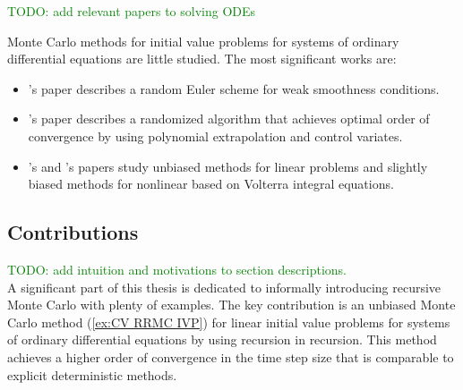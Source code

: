 \documentclass[a4paper,12pt]{article}
\begin{document}
\begin{related}

    \textcolor{green}{
        TODO: add relevant papers to solving ODEs
    }

    Monte Carlo methods for initial value problems for systems of ordinary
    differential equations are little studied. The most significant works are:
    \begin{itemize}
        \item \citeauthor{jentzen_random_2009}'s \citeyear{jentzen_random_2009}
              \cite{jentzen_random_2009} paper describes a random Euler scheme for
              weak smoothness conditions.

        \item \citeauthor{daun_randomized_2011}'s \citeyear{daun_randomized_2011}
              \cite{daun_randomized_2011} paper describes a randomized algorithm that
              achieves optimal order of convergence by using polynomial
              extrapolation and control variates.

        \item \citeauthor{ermakov_monte_2019}'s \citeyear{ermakov_monte_2019}
              \cite{ermakov_monte_2019}
              and \citeauthor{ermakov_monte_2021}'s \citeyear{ermakov_monte_2021}
              \cite{ermakov_monte_2021}
              papers study unbiased  methods
              for linear problems and slightly biased methods for nonlinear based
              on Volterra integral equations.

    \end{itemize}


\end{related}

\subsection{Contributions}

\textcolor{green}{
    TODO: add intuition and motivations to section descriptions.\\
}
A significant part of this thesis is dedicated to informally introducing recursive Monte Carlo
with plenty of examples.
The key contribution is an unbiased Monte Carlo method
(\ref{ex:CV RRMC IVP}) for
linear initial value problems for systems of ordinary
differential equations by using recursion in recursion.
This method achieves a higher order of convergence
in the time step size that is comparable to explicit
deterministic methods.
\end{document}
